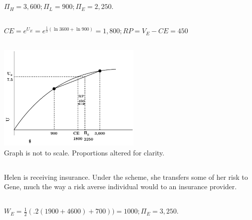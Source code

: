 \documentclass{article}
\begin{document}
\section[3]{}
	\subsection[a]{}
		$ \Pi_H = 3,600; \Pi_L = 900; \Pi_E = 2,250.$
	\subsection[b]{}
		$CE = e^{U_E} = e^{\frac{1}{2}(\ln 3600+\ln 900)}=1,800; RP = V_E - CE = 450 $
	\subsection[c]{}
		\includegraphics[height=2in]{Charts/3c}
		 \\Graph is not to scale. Proportions altered for clarity. 
	\subsection[d]{}
		Helen is receiving insurance. Under the scheme, she transfers some of her risk to Gene, much the way a risk averse individual would to an insurance provider. 
	\subsection[e]{}
		$W_E = \frac{1}{2}(.2(1900+4600)+700)) = 1000; \Pi_E = 3,250.$
\end{document}

